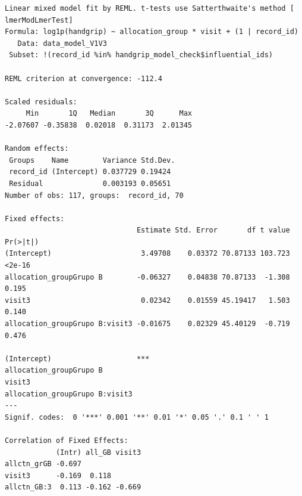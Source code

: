 \documentclass[
  letterpaper,
  DIV=11,
  numbers=noendperiod]{scrartcl}
\newenvironment{Shaded}{\begin{snugshade}}{\end{snugshade}}
\newcommand{\NormalTok}[1]{\textcolor[rgb]{0.00,0.23,0.31}{#1}}
\newcommand{\SpecialCharTok}[1]{\textcolor[rgb]{0.37,0.37,0.37}{#1}}
\begin{document}
\begin{verbatim}
Linear mixed model fit by REML. t-tests use Satterthwaite's method [
lmerModLmerTest]
Formula: log1p(handgrip) ~ allocation_group * visit + (1 | record_id)
   Data: data_model_V1V3
 Subset: !(record_id %in% handgrip_model_check$influential_ids)

REML criterion at convergence: -112.4

Scaled residuals: 
     Min       1Q   Median       3Q      Max 
-2.07607 -0.35838  0.02018  0.31173  2.01345 

Random effects:
 Groups    Name        Variance Std.Dev.
 record_id (Intercept) 0.037729 0.19424 
 Residual              0.003193 0.05651 
Number of obs: 117, groups:  record_id, 70

Fixed effects:
                               Estimate Std. Error       df t value Pr(>|t|)
(Intercept)                     3.49708    0.03372 70.87133 103.723   <2e-16
allocation_groupGrupo B        -0.06327    0.04838 70.87133  -1.308    0.195
visit3                          0.02342    0.01559 45.19417   1.503    0.140
allocation_groupGrupo B:visit3 -0.01675    0.02329 45.40129  -0.719    0.476
                                  
(Intercept)                    ***
allocation_groupGrupo B           
visit3                            
allocation_groupGrupo B:visit3    
---
Signif. codes:  0 '***' 0.001 '**' 0.01 '*' 0.05 '.' 0.1 ' ' 1

Correlation of Fixed Effects:
            (Intr) all_GB visit3
allctn_grGB -0.697              
visit3      -0.169  0.118       
allctn_GB:3  0.113 -0.162 -0.669
\end{verbatim}

\begin{Shaded}
\end{Shaded}
\end{document}
